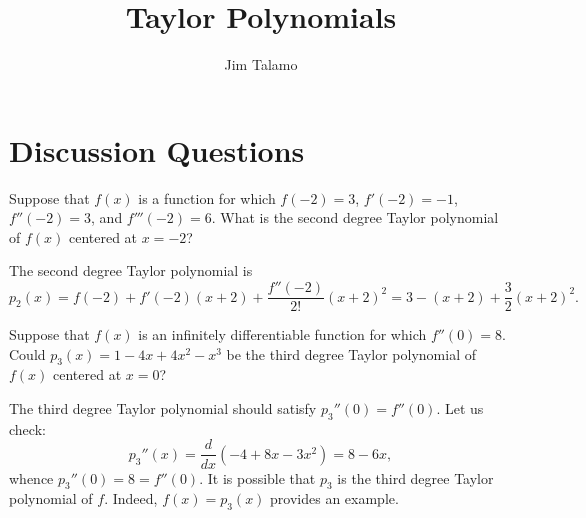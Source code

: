 \documentclass[noauthor]{ximera}
\author{Jim Talamo}
\title{Taylor Polynomials}
\begin{document}
\begin{abstract}
\end{abstract}
\maketitle

\vspace{-0.9in}

\section{Discussion Questions}

\begin{problem} 
Suppose that $f(x)$ is a function for which $f(-2)=3$, $f'(-2) =-1$, $f''(-2)=3$, and $f'''(-2)=6$.  What is the second degree Taylor polynomial of $f(x)$ centered at $x=-2$?

\begin{freeResponse}
The second degree Taylor polynomial is 
$$
p_2(x) = f(-2) + f'(-2)(x+2) + \frac{f''(-2)}{2!}(x+2)^2 = 3 - (x+2) + \frac{3}{2}(x+2)^2.
$$
\end{freeResponse}
\end{problem}


\begin{problem} 
Suppose that $f(x)$ is an infinitely differentiable function for which $f''(0)=8$.  Could $p_3(x) = 1-4x+4x^2-x^3$ be the third degree Taylor polynomial of $f(x)$ centered at $x=0$?

\begin{freeResponse}
The third degree Taylor polynomial should satisfy $p_3''(0) = f''(0)$. Let us check:
$$
p_3''(x) = \frac{d}{dx} \left(-4 + 8x - 3x^2\right) = 8 - 6x,
$$
whence $p_3''(0)=8 = f''(0)$. It is possible that $p_3$ is the third degree Taylor polynomial of $f$. Indeed, $f(x)=p_3(x)$ provides an example.
\end{freeResponse}
\end{problem}
\end{document}
